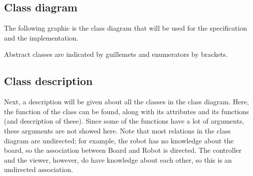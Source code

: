 \subsection{Class diagram}
	The following graphic is the class diagram that will be used for the specification and the implementation.

	
    Abstract classes are indicated by guillemets and enumerators by brackets.

\subsection{Class description}
    Next, a description will be given about all the classes in the class diagram. Here, the function of the class can be found, along with its attributes and its functions (and description of these). Since some of the functions have a lot of arguments, these arguments are not showed here. Note that most relations in the class diagram are undirected; for example, the robot has no knowledge about the board, so the association between Board and Robot is directed. The controller and the viewer, however, do have knowledge about each other, so this is an undirected association.


